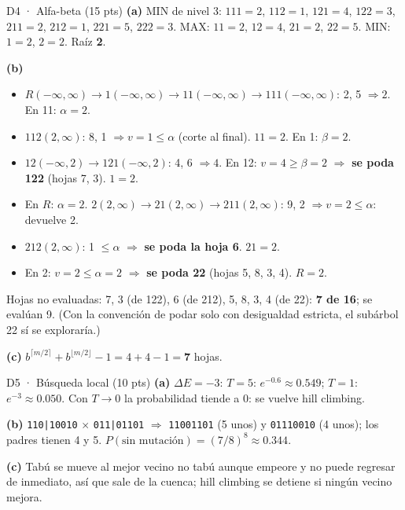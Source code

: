 \begin{solucion}{D4 · Alfa-beta (15 pts)}
\textbf{(a)} MIN de nivel 3: $111=2$, $112=1$, $121=4$, $122=3$, $211=2$, $212=1$, $221=5$, $222=3$.
MAX: $11=2$, $12=4$, $21=2$, $22=5$. MIN: $1=2$, $2=2$. Raíz \textbf{2}.

\textbf{(b)}
\begin{itemize}[nosep]
\item $R(-\infty,\infty)\to1(-\infty,\infty)\to11(-\infty,\infty)\to111(-\infty,\infty)$: 2, 5 $\Rightarrow2$. En 11: $\alpha=2$.
\item $112(2,\infty)$: 8, 1 $\Rightarrow v=1\le\alpha$ (corte al final). $11=2$. En 1: $\beta=2$.
\item $12(-\infty,2)\to121(-\infty,2)$: 4, 6 $\Rightarrow4$. En 12: $v=4\ge\beta=2$ $\Rightarrow$ \textbf{se poda 122} (hojas 7, 3). $1=2$.
\item En $R$: $\alpha=2$. $2(2,\infty)\to21(2,\infty)\to211(2,\infty)$: 9, 2 $\Rightarrow v=2\le\alpha$: devuelve 2.
\item $212(2,\infty)$: 1 $\le\alpha$ $\Rightarrow$ \textbf{se poda la hoja 6}. $21=2$.
\item En 2: $v=2\le\alpha=2$ $\Rightarrow$ \textbf{se poda 22} (hojas 5, 8, 3, 4). $R=2$.
\end{itemize}
Hojas no evaluadas: 7, 3 (de 122), 6 (de 212), 5, 8, 3, 4 (de 22): \textbf{7 de 16}; se evalúan 9.
(Con la convención de podar solo con desigualdad estricta, el subárbol 22 sí se exploraría.)

\textbf{(c)} $b^{\lceil m/2\rceil}+b^{\lfloor m/2\rfloor}-1=4+4-1=\mathbf{7}$ hojas.
\end{solucion}

\begin{solucion}{D5 · Búsqueda local (10 pts)}
\textbf{(a)} $\Delta E=-3$: $T=5$: $e^{-0.6}\approx0.549$; $T=1$: $e^{-3}\approx0.050$. Con $T\to0$ la probabilidad
tiende a 0: se vuelve hill climbing.

\textbf{(b)} \texttt{110|10010} $\times$ \texttt{011|01101} $\Rightarrow$ \texttt{11001101} (5 unos) y \texttt{01110010}
(4 unos); los padres tienen 4 y 5. $P(\text{sin mutación})=(7/8)^8\approx0.344$.

\textbf{(c)} Tabú se mueve al mejor vecino no tabú aunque empeore y no puede regresar de inmediato, así
que sale de la cuenca; hill climbing se detiene si ningún vecino mejora.
\end{solucion}

